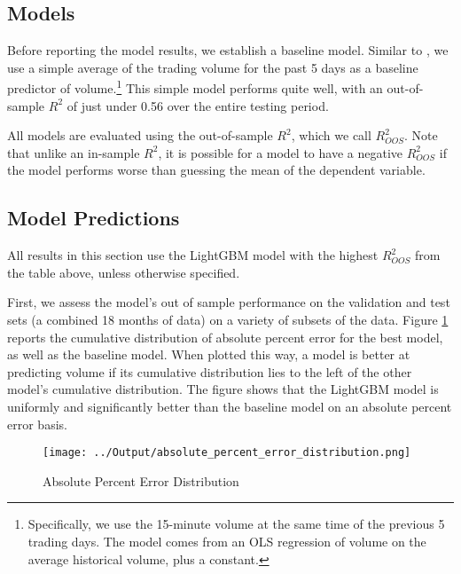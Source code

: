 \documentclass[12pt]{article}
\begin{document}
\subsection{Models}
Before reporting the model results, we establish a baseline model. Similar to \textcite{goyenko2024trading}, we use a simple average of the trading volume for the past 5 days as a baseline predictor of volume.\footnote{Specifically, we use the 15-minute volume at the same time of the previous 5 trading days. The model comes from an OLS regression of volume on the average historical volume, plus a constant.} This simple model performs quite well, with an out-of-sample $R^2$ of just under 0.56 over the entire testing period.

All models are evaluated using the out-of-sample $R^2$, which we call $R^2_{OOS}$. Note that unlike an in-sample $R^2$, it is possible for a model to have a negative $R^2_{OOS}$ if the model performs worse than guessing the mean of the dependent variable.



\subsection{Model Predictions}
All results in this section use the LightGBM model with the highest $R^2_{OOS}$ from the table above, unless otherwise specified.

First, we assess the model's out of sample performance on the validation and test sets (a combined 18 months of data) on a variety of subsets of the data. Figure \ref{fig:absolute_percent_error_distribution} reports the cumulative distribution of absolute percent error for the best model, as well as the baseline model. When plotted this way, a model is better at predicting volume if its cumulative distribution lies to the left of the other model's cumulative distribution. The figure shows that the LightGBM model is uniformly and significantly better than the baseline model on an absolute percent error basis.

\begin{figure}[H]
    \centering
    \caption{Absolute Percent Error Distribution}
    \texttt{[image: ../Output/absolute\_percent\_error\_distribution.png]}
    \label{fig:absolute_percent_error_distribution}
\end{figure}
\end{document}
